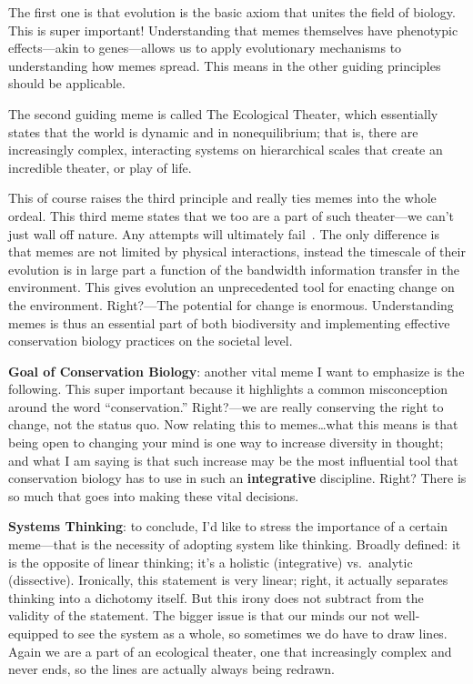 \documentclass[basic]{inVerba-notes}
\begin{document}
    The first one is that evolution is the basic axiom that unites the field of biology. This is super important! Understanding that memes themselves have phenotypic effects---akin to genes---allows us to apply evolutionary mechanisms to understanding how memes spread. This means in the other guiding principles should be applicable.
    
    The second guiding meme is called The Ecological Theater, which essentially states that the world is dynamic and in nonequilibrium; that is, there are increasingly complex, interacting systems on hierarchical scales that create an incredible theater, or play of life.
    
    This of course raises the third principle and really ties memes into the whole ordeal. This third meme states that we too are a part of such theater---we can't just wall off nature. Any attempts will ultimately fail~. The only difference is that memes are not limited by physical interactions, instead the timescale of their evolution is in large part a function of the bandwidth information transfer in the environment. This gives evolution an unprecedented tool for enacting change on the environment. Right?---The potential for change is enormous. Understanding memes is thus an essential part of both biodiversity and implementing effective conservation biology practices on the societal level.

    \textbf{Goal of Conservation Biology}: another vital meme I want to emphasize is the following. This super important because it highlights a common misconception around the word ``conservation.'' Right?---we are really conserving the right to change, not the status quo. Now relating this to memes\dots what this means is that being open to changing your mind is one way to increase diversity in thought; and what I am saying is that such increase may be the most influential tool that conservation biology has to use in such an \textbf{integrative} discipline. Right? There is so much that goes into making these vital decisions.

    \textbf{Systems Thinking}: to conclude, I'd like to stress the importance of a certain meme---that is the necessity of adopting system like thinking. Broadly defined: it is the opposite of linear thinking; it's a holistic (integrative) vs.\ analytic (dissective). Ironically, this statement is very linear; right, it actually separates thinking into a dichotomy itself. But this irony does not subtract from the validity of the statement. The bigger issue is that our minds our not well-equipped to see the system as a whole, so sometimes we do have to draw lines. Again we are a part of an ecological theater, one that increasingly complex and never ends, so the lines are actually always being redrawn.
\end{document}
